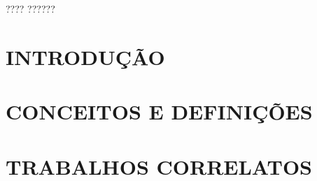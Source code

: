 \documentclass[
	12pt,				%
    oneside,
	a4paper,			%
	chapter=TITLE,		%
	english,			%
	brazil				%
	]{abntex2}
\begin{document}
\listoftables*
\cleardoublepage{}

\begin{siglas}
  \item[????] ??????%
\end{siglas}


\tableofcontents*
\cleardoublepage{}



\textual{}
\chapter{INTRODUÇÃO}
\label{chapter:introducao}


\chapter{CONCEITOS E DEFINIÇÕES}
\label{chapter:fundamentacao}


\chapter{TRABALHOS CORRELATOS}
\label{chapter:correlatos}
%
\end{document}
